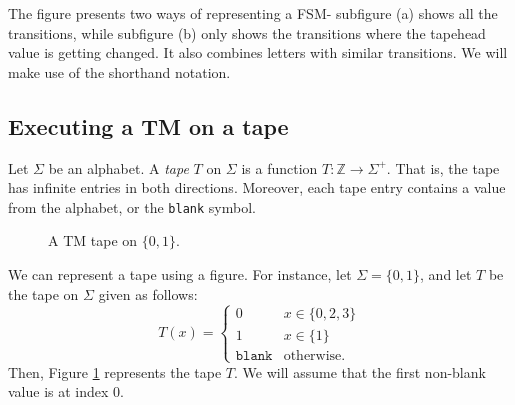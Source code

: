 The figure presents two ways of representing a FSM- subfigure (a) shows all the transitions, while subfigure (b) only shows the transitions where the tapehead value is getting changed. It also combines letters with similar transitions. We will make use of the shorthand notation.

\subsection{Executing a TM on a tape}
Let $\Sigma$ be an alphabet. A \emph{tape} $T$ on $\Sigma$ is a function $T\colon \mathbb{Z} \to \Sigma^+$. That is, the tape has infinite entries in both directions. Moreover, each tape entry contains a value from the alphabet, or the \texttt{blank} symbol. 

\begin{figure}[htb]
    \centering
    \caption{A TM tape on $\{0, 1\}$.}
    \label{fig:tape_example}
\end{figure}
We can represent a tape using a figure. For instance, let $\Sigma = \{0, 1\}$, and let $T$ be the tape on $\Sigma$ given as follows:
\[T(x) = \begin{cases}
    0 & x \in \{0, 2, 3\} \\
    1 & x \in \{1\} \\
    \texttt{blank} & \text{otherwise}.
\end{cases}\]
Then, Figure \ref{fig:tape_example} represents the tape $T$. We will assume that the first non-blank value is at index 0.

